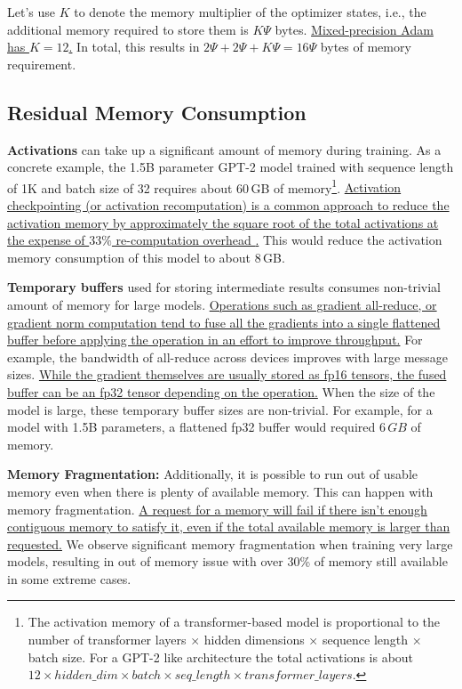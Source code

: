 Let's use $K$ to denote the memory multiplier of the optimizer states, i.e., the additional memory required to store them is $K\Psi$ bytes. \uline{Mixed-precision Adam has $K=12$.} In total, this results in $2\Psi + 2\Psi + K\Psi = 16\Psi$ bytes of memory requirement.

\subsection{Residual Memory Consumption}

\textbf{Activations} can take up a significant amount of memory \cite{DBLP:journals/corr/ChenXZG16} during training.  As a concrete example, the 1.5B parameter GPT-2 model trained with sequence length of 1K and batch size of 32 requires about 60\,GB of memory\footnote{The activation memory of a transformer-based model is proportional to the number of transformer layers $\times$ hidden dimensions $\times$  sequence length $\times$ batch size.  For a GPT-2 like architecture the total activations is about  $12 \times hidden\_dim \times batch \times seq\_length \times transformer\_layers$.}. \uline{Activation checkpointing (or activation recomputation) is a common approach to reduce the activation memory by approximately the square root of the total activations at the expense of $33\%$ re-computation overhead \cite{DBLP:journals/corr/ChenXZG16}.} This would reduce the activation memory consumption of this model to about 8\,GB.

\textbf{Temporary buffers} used for storing intermediate results consumes non-trivial amount of memory for large models. \uline{Operations such as gradient all-reduce, or gradient norm computation tend to fuse all the gradients into a single flattened buffer before applying the operation in an effort to improve throughput.} For example, the bandwidth of all-reduce across devices improves with large message sizes. \uline{While the gradient themselves are usually stored as fp16 tensors, the fused buffer can be an fp32 tensor depending on the operation.} When the size of the model is large, these temporary buffer sizes are non-trivial. For example, for a model with 1.5B parameters, a flattened fp32 buffer would required $6\,GB$ of memory. 

\textbf{Memory Fragmentation: }  Additionally, it is possible to run out of usable memory even when there is plenty of available memory. This can happen with memory fragmentation. \uline{A request for a memory will fail if there isn't enough contiguous memory to satisfy it, even if the total available memory is larger than requested.} We observe significant memory fragmentation when training very large models, resulting in out of memory issue with over 30\% of memory still available in some extreme cases.
